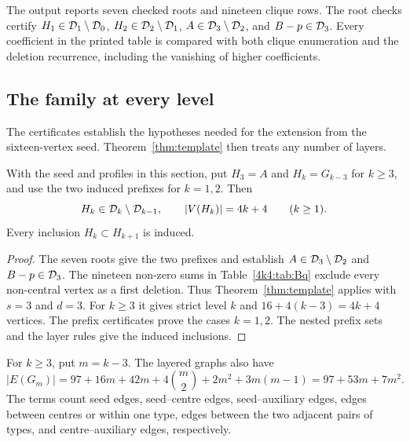The output reports seven checked roots and nineteen clique rows. The root
checks certify $H_1\in\mathcal D_1\setminus\mathcal D_0$, $H_2\in\mathcal D_2\setminus\mathcal D_1$,
$A\in\mathcal D_3\setminus\mathcal D_2$, and $B-p\in\mathcal D_3$. Every coefficient in the
printed table is compared with both clique enumeration and the deletion
recurrence, including the vanishing of higher coefficients.

\subsection{The family at every level}
The certificates establish the hypotheses needed for the extension from the sixteen-vertex seed. Theorem~\ref{thm:template} then treats any number of layers.
\begin{theorem}\label{4k4:thm:family}
With the seed and profiles in this section, put $H_3=A$ and
$H_k=G_{k-3}$ for $k\geq3$, and use the two induced prefixes for $k=1,2$.
Then
\[
 H_k\in\mathcal D_k\setminus\mathcal D_{k-1},\qquad |V(H_k)|=4k+4\qquad(k\geq1).
\]
Every inclusion $H_k\subset H_{k+1}$ is induced.
\end{theorem}
\begin{proof}
The seven roots give the two prefixes and establish
$A\in\mathcal D_3\setminus\mathcal D_2$ and $B-p\in\mathcal D_3$. The nineteen non-zero sums
in Table~\ref{4k4:tab:Bq} exclude every non-central vertex as a first deletion.
Thus Theorem~\ref{thm:template} applies with $s=3$ and $d=3$.
For $k\geq3$ it gives strict level $k$ and
$16+4(k-3)=4k+4$ vertices. The prefix certificates prove the cases
$k=1,2$. The nested prefix sets and the layer rules give the induced inclusions.
\end{proof}
For $k\geq3$, put $m=k-3$. The layered graphs also have
\[
 |E(G_m)|=97+16m+42m+4\binom m2+2m^2+3m(m-1)
          =97+53m+7m^2.
\]
The terms count seed edges, seed--centre edges, seed--auxiliary edges,
edges between centres or within one type, edges between the two adjacent
pairs of types, and centre--auxiliary edges, respectively.
